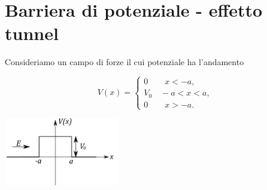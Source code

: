 \section{Barriera di potenziale -  effetto tunnel}
Consideriamo un campo di forze il cui potenziale ha l'andamento\\
\begin{minipage}{.55\textwidth}
\begin{equation}
V(x)=
\begin{cases}
0 \qquad x<-a,\\
V_0 \quad -a<x<a,\\
0 \qquad x>-a.
\end{cases}
\end{equation}
\end{minipage}
\hspace{.2cm}
\begin{minipage}{.4\textwidth}
\includegraphics[width=5cm]{immagini/cap_10/fig_10_8.png}
\end{minipage}\\

